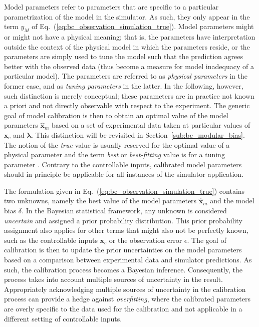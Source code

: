 Model parameters refer to parameters that are specific to a particular parametrization of the model in the simulator.
As such, they only appear in the term $y_M$ of Eq.~(\ref{eq:bc_observation_simulation_true}).
Model parameters might or might not have a physical meaning;
that is, the parameters have interpretation outside the context of the physical model in which the parameters reside, or the parameters are simply used to tune the model such that the prediction agrees better with the observed data (thus become a measure for model inadequacy of a particular model).
The parameters are referred to as \emph{physical parameters} in the former case,
and as \emph{tuning parameters} in the latter.
In the following, however, such distinction is merely conceptual;
these parameters are in practice not known a priori and not directly observable with respect to the experiment. 
The generic goal of model calibration is then to obtain an optimal value of the model parameters $\hat{\bm{x}}_m$ based on a set of experimental data taken at particular values of $\bm{x}_c$ and $\bm{\lambda}$.
This distinction will be revisited in Section~\ref{sub:bc_modular_bias}.
The notion of the \emph{true} value is usually reserved for the optimal value of a physical parameter \cite{OHagan2013} and the term \emph{best} or \emph{best-fitting} value is for a tuning parameter \cite{Bayarri2007}.
Contrary to the controllable inputs, calibrated model parameters should in principle be applicable for all instances of the simulator application.

The formulation given in Eq.~(\ref{eq:bc_observation_simulation_true}) contains two unknowns, namely the best value of the model parameters $\hat{\bm{x}}_m$ and the model bias $\delta$.
In the Bayesian statistical framework, any unknown is considered \emph{uncertain} and assigned a prior probability distribution.
This prior probability assignment also applies for other terms that might also not be perfectly known, such as the controllable inputs $\bm{x}_c$ or the observation error $\epsilon$. 
The goal of calibration is then to update the prior uncertainties on the model parameters based on a comparison between experimental data and simulator predictions.
As such, the calibration process becomes a Bayesian inference.
Consequently, the process takes into account multiple sources of uncertainty in the result.
Appropriately acknowledging multiple sources of uncertainty in the calibration process can provide a hedge against \emph{overfitting}, where the calibrated parameters are overly specific to the data used for the calibration and not applicable in a different setting of controllable inputs.

